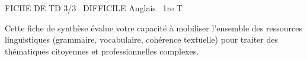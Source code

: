 \documentclass[11pt]{article}
\begin{document}
\begin{tcolorbox}[enhanced,colback=popink,colframe=popink,arc=10pt,boxrule=0pt,left=12pt,right=12pt,top=9pt,bottom=9pt]
{\color{white}\popxbold\small FICHE DE TD 3/3 \textbullet\ DIFFICILE \hfill Anglais \textbullet\ 1re T\par}
\end{tcolorbox}
\vspace{4pt}
Cette fiche de synthèse évalue votre capacité à mobiliser l'ensemble des ressources linguistiques (grammaire, vocabulaire, cohérence textuelle) pour traiter des thématiques citoyennes et professionnelles complexes.
\end{document}
